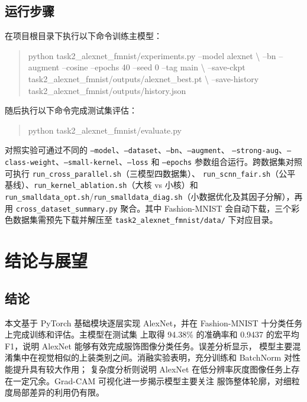 \documentclass[12pt,a4paper,fontset=fandol]{ctexart}
\numberwithin{figure}{section}
\numberwithin{table}{section}
\numberwithin{equation}{section}
\begin{document}
\subsection{运行步骤}
在项目根目录下执行以下命令训练主模型：
\begin{quote}
{\small\ttfamily
python task2\_alexnet\_fmnist/experiments.py --model alexnet \textbackslash\newline
\hspace*{2em}--bn --augment --cosine --epochs 40 --seed 0 --tag main \textbackslash\newline
\hspace*{2em}--save-ckpt task2\_alexnet\_fmnist/outputs/alexnet\_best.pt \textbackslash\newline
\hspace*{2em}--save-history task2\_alexnet\_fmnist/outputs/history.json}
\end{quote}
随后执行以下命令完成测试集评估：
\begin{quote}
{\small\ttfamily python task2\_alexnet\_fmnist/evaluate.py}
\end{quote}
对照实验可通过不同的 \texttt{--model}、\texttt{--dataset}、\texttt{--bn}、\texttt{--augment}、
\texttt{--strong-aug}、\texttt{--class-weight}、\texttt{--small-kernel}、\texttt{--loss} 和 \texttt{--epochs}
参数组合运行。跨数据集对照可执行 \texttt{run\_cross\_parallel.sh}（三模型四数据集）、
\texttt{run\_scnn\_fair.sh}（公平基线）、\texttt{run\_kernel\_ablation.sh}（大核 vs 小核）和
\texttt{run\_smalldata\_opt.sh}/\texttt{run\_smalldata\_diag.sh}（小数据优化及其因子分解），再用
\texttt{cross\_dataset\_summary.py} 聚合。其中 Fashion-MNIST 会自动下载，三个彩色数据集需预先下载并解压至
\texttt{task2\_alexnet\_fmnist/data/} 下对应目录。

\section{结论与展望}

\subsection{结论}
本文基于 PyTorch 基础模块逐层实现 AlexNet，并在 Fashion-MNIST 十分类任务上完成训练和评估。主模型在测试集
上取得 94.38\% 的准确率和 0.9437 的宏平均 F1，说明 AlexNet 能够有效完成服饰图像分类任务。误差分析显示，
模型主要混淆集中在视觉相似的上装类别之间。消融实验表明，充分训练和 BatchNorm 对性能提升具有较大作用；
复杂度分析则说明 AlexNet 在低分辨率灰度图像任务上存在一定冗余。Grad-CAM 可视化进一步揭示模型主要关注
服饰整体轮廓，对细粒度局部差异的利用仍有限。
\end{document}
